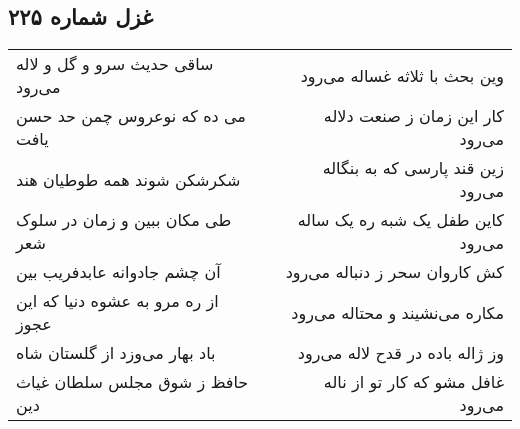 \begin{center}
\section*{غزل شماره ۲۲۵}
\label{sec:sh225}
\begin{longtable}{l p{0.5cm} r}
ساقی حدیث سرو و گل و لاله می‌رود
&&
وین بحث با ثلاثه غساله می‌رود
\\
می ده که نوعروس چمن حد حسن یافت
&&
کار این زمان ز صنعت دلاله می‌رود
\\
شکرشکن شوند همه طوطیان هند
&&
زین قند پارسی که به بنگاله می‌رود
\\
طی مکان ببین و زمان در سلوک شعر
&&
کاین طفل یک شبه ره یک ساله می‌رود
\\
آن چشم جادوانه عابدفریب بین
&&
کش کاروان سحر ز دنباله می‌رود
\\
از ره مرو به عشوه دنیا که این عجوز
&&
مکاره می‌نشیند و محتاله می‌رود
\\
باد بهار می‌وزد از گلستان شاه
&&
وز ژاله باده در قدح لاله می‌رود
\\
حافظ ز شوق مجلس سلطان غیاث دین
&&
غافل مشو که کار تو از ناله می‌رود
\\
\end{longtable}
\end{center}
